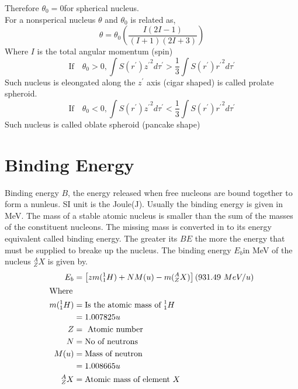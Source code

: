 \begin{enumerate}
Therefore $\theta_0=0$for spherical nucleus.\\
For a nonsperical nucleus $\theta$ and $\theta_0$ is related as,
$$\theta=\theta_0\left( \frac{I(2I-1)}{(I+1)(2I+3)}\right) $$
Where $I$ is the total angular momentum (spin)
$$\text{If}\quad\theta_0>0, \int S(r^\prime){z^\prime}^2d\tau^\prime>\frac{1}{3}\int S(r^\prime){r^\prime}^2d\tau^\prime$$
Such nucleus is eleongated along the $z^\prime$ axis (cigar shaped) is called prolate spheroid.
$$\text{If}\quad\theta_0<0, \int S(r^\prime){z^\prime}^2d\tau^\prime<\frac{1}{3}\int S(r^\prime){r^\prime}^2d\tau^\prime$$
Such nucleus is called oblate spheroid (pancake shape)
\end{enumerate}
\section{Binding Energy}
Binding energy $B$, the energy released when free nucleons are bound together to form a nunleus. SI unit is the Joule(J). Usually the binding energy is given in MeV. The mass of a stable atomic nucleus is smaller than the sum of the masses of the constituent nucleons. The missing mass is converted in to its energy equivalent called binding energy. The greater its $BE$ the more the energy that must be supplied to breake up the nucleus. The binding energy $E_b$in MeV  of the nucleus $^A_ZX$ is given by.
\begin{align*}
E_b&=\left[ zm(^1_1H)+NM(u)-m(^A_ZX)\right]\left(931.49\  MeV/u \right)  \\
\intertext{Where}
m(^1_1H)&=\text{Is the atomic mass of }^1_1H\\
&=1.007825 u\\
Z&= \text{ Atomic number}\\
N&= \text{No of neutrons}\\
M(u)&=\text{Mass of neutron}\\
&=1.008665 u\\
^A_ZX&= \text{Atomic mass of element }X
\end{align*}
